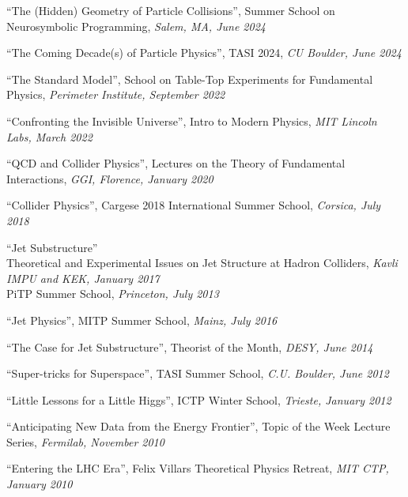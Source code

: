 \bbl

\item ``The (Hidden) Geometry of Particle Collisions'', Summer School on Neurosymbolic Programming, \emph{Salem, MA, June 2024}

\item ``The Coming Decade(s) of Particle Physics'', TASI 2024, \emph{CU Boulder, June 2024}

\item ``The Standard Model'', School on Table-Top Experiments for Fundamental Physics, \emph{Perimeter Institute, September 2022}

\item ``Confronting the Invisible Universe'', Intro to Modern Physics, \emph{MIT Lincoln Labs, March 2022}

\item ``QCD and Collider Physics'', Lectures on the Theory of Fundamental Interactions, \emph{GGI, Florence, January 2020}

\item ``Collider Physics'', Cargese 2018 International Summer School, \emph{Corsica, July 2018}

\item ``Jet Substructure''
\\ Theoretical and Experimental Issues on Jet Structure at Hadron Colliders, \emph{Kavli IMPU and KEK, January 2017}
\\ PiTP Summer School, \emph{Princeton, July 2013}

\item ``Jet Physics'', MITP Summer School, \emph{Mainz, July 2016}

\item ``The Case for Jet Substructure'', Theorist of the Month, \emph{DESY, June 2014}

\item ``Super-tricks for Superspace'', TASI Summer School, \emph{C.U. Boulder, June 2012}

\item ``Little Lessons for a Little Higgs'', ICTP Winter School, \emph{Trieste, January 2012}

\item ``Anticipating New Data from the Energy Frontier'', Topic of the Week Lecture Series, \emph{Fermilab, November 2010}

\item ``Entering the LHC Era'', Felix Villars Theoretical Physics Retreat, \emph{MIT CTP, January 2010}

\el
